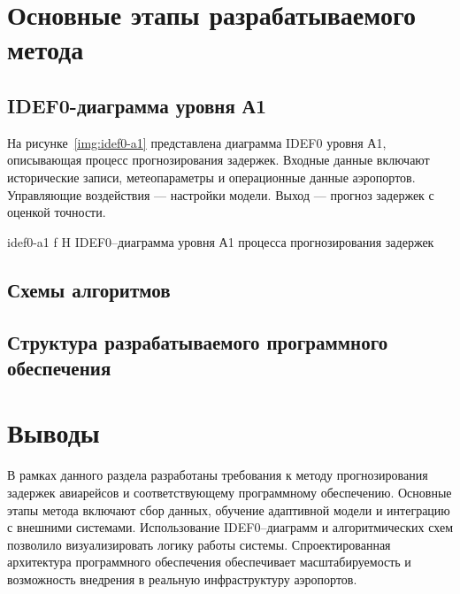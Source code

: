 \section{Основные этапы разрабатываемого метода}
\subsection{IDEF0-диаграмма уровня А1}
На рисунке~\ref{img:idef0-a1} представлена диаграмма IDEF0 уровня А1, описывающая процесс прогнозирования задержек.
Входные данные включают исторические записи, метеопараметры и операционные данные аэропортов.
Управляющие воздействия — настройки модели.
Выход — прогноз задержек с оценкой точности.

{idef0-a1}
{f}
{H}
{\textwidth}
{IDEF0--диаграмма уровня А1 процесса прогнозирования задержек}


\subsection{Схемы алгоритмов}

\subsection{Структура разрабатываемого программного обеспечения}

\section*{Выводы}
В рамках данного раздела разработаны требования к методу прогнозирования задержек авиарейсов и соответствующему программному обеспечению.
Основные этапы метода включают сбор данных, обучение адаптивной модели и интеграцию с внешними системами.
Использование IDEF0--диаграмм и алгоритмических схем позволило визуализировать логику работы системы.
Спроектированная архитектура программного обеспечения обеспечивает масштабируемость и возможность внедрения в реальную инфраструктуру аэропортов.
